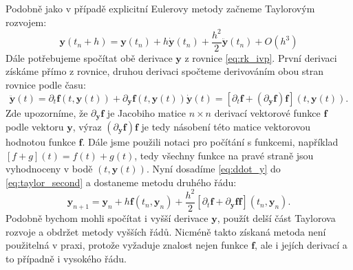 \documentclass[a4paper, 12pt]{book}
\theoremstyle{definition}
\def\vc#1{\mathbf{\boldsymbol{#1}}}     %
\def\prtl{\partial}                                        %
\begin{document}
Podobně jako v případě explicitní Eulerovy metody začneme 
Taylorovým rozvojem:
\begin{equation}
    \label{eq:taylor_second}
    \vc y(t_n + h) = \vc y(t_n) + h\dot{\vc y}(t_n)+ \frac{h^2}{2} \ddot{\vc y}(t_n) + O(h^3)
\end{equation}
Dále potřebujeme spočítat obě derivace $\vc y$ z rovnice \eqref{eq:rk_ivp}. První derivaci získáme přímo z rovnice,
druhou derivaci spočteme derivováním obou stran rovnice podle času:
\begin{equation}
    \label{eq:ddot_y}
    \ddot{\vc y}(t) = \prtl_t \vc f(t, \vc y(t)) + \prtl_{\vc y} \vc f(t, \vc y(t)) \dot{\vc y}(t) =
                     \left[ \prtl_t \vc f + (\prtl_{\vc y} \vc f) \vc f \right] (t, \vc y(t)).
\end{equation}
Zde upozorníme, že $\prtl_{\vc y} \vc f$ je Jacobiho matice $n\times n$ derivací vektorové funkce $\vc f$ podle vektoru $\vc y$, 
výraz $(\prtl_{\vc y} \vc f) \vc f$ je tedy násobení této matice vektorovou hodnotou funkce $\vc f$.  Dále jsme použili notaci 
pro počítání s funkcemi, například $[f + g](t) = f(t) + g(t)$, tedy všechny funkce na pravé straně jsou vyhodnoceny v bodě $(t, \vc y(t))$. 
Nyní dosadíme \eqref{eq:ddot_y} do \eqref{eq:taylor_second} a dostaneme metodu druhého řádu:
\[
    \vc y_{n+1} = \vc y_n + h \vc f(t_n, \vc y_n) + \frac{h^2}{2}\left[\prtl_t \vc f + \prtl_{\vc y} \vc f \vc f \right] (t_n, \vc y_n).
\]
Podobně bychom mohli spočítat i vyšší derivace $\vc y$, použít delší část Taylorova rozvoje a obdržet metody vyšších řádů. 
Nicméně takto získaná metoda není použitelná v praxi, protože vyžaduje znalost nejen funkce $\vc f$, ale i jejích derivací 
a to případně i vysokého řádu. 
\end{document}
